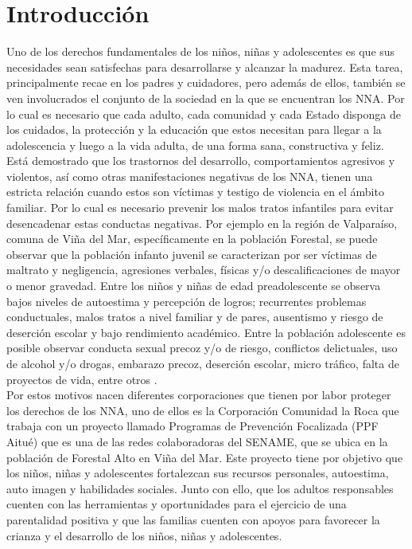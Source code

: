 \chapter{Introducción}
\label{intr}
\vspace{2mm}
\normalsize


Uno de los derechos fundamentales de los niños, niñas y adolescentes es que sus necesidades sean satisfechas para desarrollarse y alcanzar la madurez. 
Esta tarea, principalmente recae en los padres y cuidadores, pero además de ellos, también se ven involucrados el conjunto de la sociedad en la que se encuentran los NNA. Por lo cual es necesario que cada adulto, cada comunidad y cada Estado disponga de los cuidados, la protección y la educación que estos necesitan para llegar a la adolescencia y luego a la vida adulta, de una forma sana, constructiva y feliz\cite{REF1}. \\

Está demostrado\cite{REF2} que los trastornos del desarrollo, comportamientos agresivos y violentos, así como otras manifestaciones negativas de los NNA, tienen una estricta relación cuando estos son víctimas y testigo de violencia en el ámbito familiar. Por lo cual es necesario prevenir los malos tratos infantiles para evitar desencadenar estas conductas negativas. Por ejemplo en la región de Valparaíso, comuna de Viña del Mar, específicamente en la población Forestal, se puede observar que la población infanto juvenil se caracterizan por ser víctimas de maltrato y negligencia, agresiones verbales, físicas y/o descalificaciones de mayor o menor gravedad. Entre los niños y niñas de edad preadolescente se observa bajos niveles de autoestima y percepción de logros; recurrentes problemas conductuales, malos tratos a nivel familiar y de pares, ausentismo y riesgo de deserción escolar y bajo rendimiento académico. Entre la población adolescente es posible observar conducta sexual precoz y/o de riesgo, conflictos delictuales, uso de alcohol y/o drogas, embarazo precoz, deserción escolar, micro tráfico,  falta de proyectos de vida, entre otros \cite{REF3}.\\

Por estos motivos nacen diferentes corporaciones que tienen por labor proteger los derechos de los NNA, uno de ellos es la Corporación Comunidad la Roca que trabaja con un proyecto llamado Programas de Prevención Focalizada (PPF Aitué) que es una de las redes colaboradoras del SENAME, que se ubica en la población de Forestal Alto en Viña del Mar. Este proyecto tiene por objetivo que los niños, niñas y adolescentes fortalezcan sus recursos personales, autoestima, auto imagen y habilidades sociales. Junto con ello, que los adultos responsables cuenten con las herramientas y oportunidades para el ejercicio de una parentalidad positiva y que las familias cuenten con apoyos para favorecer la crianza y el desarrollo de los niños, niñas y adolescentes. \\

